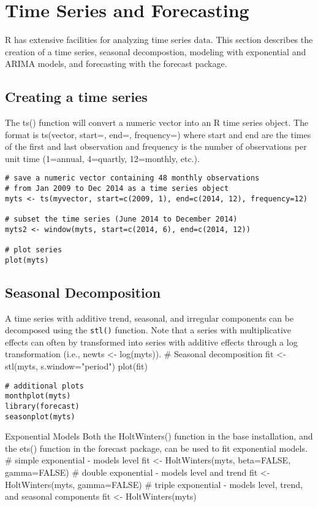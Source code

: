 \section*{Time Series and Forecasting}
R has extensive facilities for analyzing time series data. This section describes the creation of a time series, seasonal decompostion, modeling with exponential and ARIMA models, and forecasting with the forecast package.
\subsection{Creating a time series}
The ts() function will convert a numeric vector into an R time series object. The format is ts(vector, start=, end=, frequency=) where start and end are the times of the first and last observation and frequency is the number of observations per unit time (1=annual, 4=quartly, 12=monthly, etc.).

\begin{framed}
	\begin{verbatim}
# save a numeric vector containing 48 monthly observations
# from Jan 2009 to Dec 2014 as a time series object
myts <- ts(myvector, start=c(2009, 1), end=c(2014, 12), frequency=12) 

# subset the time series (June 2014 to December 2014)
myts2 <- window(myts, start=c(2014, 6), end=c(2014, 12)) 

# plot series
plot(myts)
\end{verbatim}
\end{framed}
\subsection*{Seasonal Decomposition}
A time series with additive trend, seasonal, and irregular components can be decomposed using the \texttt{stl()} function. Note that a series with multiplicative effects can often by transformed into series with additive effects through a log transformation (i.e., newts <- log(myts)).
# Seasonal decomposition
fit <- stl(myts, s.window="period")
plot(fit)

\begin{framed}
\begin{verbatim}
# additional plots
monthplot(myts)
library(forecast)
seasonplot(myts)
\end{verbatim}
\end{framed}
Exponential Models
Both the HoltWinters() function in the base installation, and the ets() function in the forecast package, can be used to fit exponential models.
# simple exponential - models level
fit <- HoltWinters(myts, beta=FALSE, gamma=FALSE)
# double exponential - models level and trend
fit <- HoltWinters(myts, gamma=FALSE)
# triple exponential - models level, trend, and seasonal components
fit <- HoltWinters(myts)

